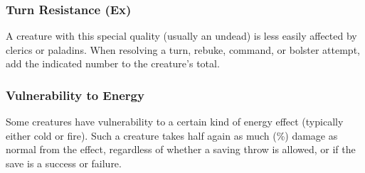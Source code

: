 \subsubsection{Turn Resistance (Ex)} A creature with this special quality (usually an undead) is less easily affected by clerics or paladins. When resolving a turn, rebuke, command, or bolster attempt, add the indicated number to the creature's  total.

\subsubsection{Vulnerability to Energy} Some creatures have vulnerability to a certain kind of energy effect (typically either cold or fire). Such a creature takes half again as much (\%) damage as normal from the effect, regardless of whether a saving throw is allowed, or if the save is a success or failure.
